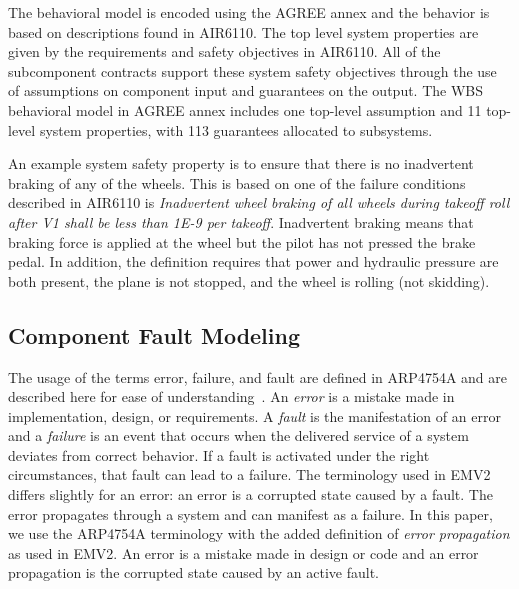 

The behavioral model is encoded using the AGREE annex and the behavior is based on descriptions found in AIR6110. The top level system properties are given by the requirements and safety objectives in AIR6110. All of the subcomponent contracts support these system safety objectives through the use of assumptions on component input and guarantees on the output. The WBS behavioral model in AGREE annex includes one top-level assumption and  11 top-level system properties, with 113 guarantees allocated to subsystems.  

An example system safety property is to ensure that there is no inadvertent braking of any of the wheels. This is based on one of the failure conditions described in AIR6110 is \textit{Inadvertent wheel braking of all wheels during takeoff roll after V1 shall be less than 1E-9 per takeoff}. 
Inadvertent braking means that braking force is applied at the wheel but the pilot has not pressed the brake pedal.  In addition, the definition requires that power and hydraulic pressure are both present, the plane is not stopped, and the wheel is rolling (not skidding).


\subsection{Component Fault Modeling}

The usage of the terms error, failure, and fault are defined in ARP4754A and are described here for ease of understanding~\cite{SAE:ARP4754A}. An \textit{error} is a mistake made in implementation, design, or requirements. A \textit{fault} is the manifestation of an error and a \textit{failure} is an event that occurs when the delivered service of a system deviates from correct behavior. If a fault is activated under the right circumstances, that fault can lead to a failure. The terminology used in EMV2 differs slightly for an error: an error is a corrupted state caused by a fault. The error propagates through a system and can  manifest as a failure. In this paper, we use the ARP4754A terminology with the added definition of \textit{error propagation} as used in EMV2. An error is a mistake made in design or code and an error propagation is the corrupted state caused by an active fault. 

